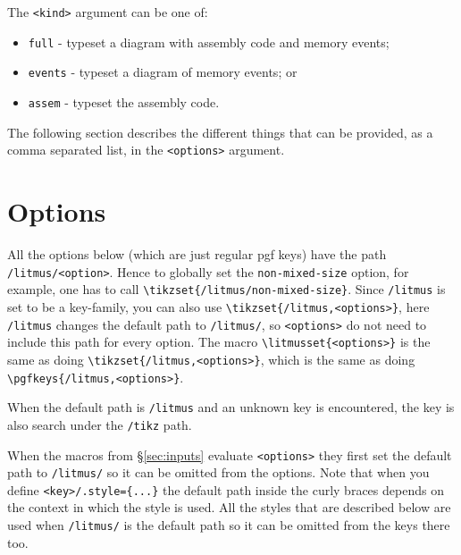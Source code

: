 \documentclass[a4paper]{article}
\begin{document}
The \lstinline|<kind>| argument can be one of:
\begin{itemize}\itemsep0ex
  \item[] \lstinline|full| - typeset a diagram with assembly code and memory events;
  \item[] \lstinline|events| - typeset a diagram of memory events; or
  \item[] \lstinline|assem| - typeset the assembly code.
\end{itemize}

The following section describes the different things that can be provided, as
a comma separated list, in the \lstinline|<options>| argument.

\section{Options}

All the options below (which are just regular pgf keys) have the path
\lstinline|/litmus/<option>|.
Hence to globally set the \lstinline|non-mixed-size| option, for example,
one has to call \lstinline+\tikzset{/litmus/non-mixed-size}+.
Since \lstinline|/litmus| is set to be a key-family, you can also use
\lstinline+\tikzset{/litmus,<options>}+, here \lstinline|/litmus| changes the
default path to \lstinline|/litmus/|, so \lstinline|<options>| do not need to include
this path for every option.
The macro \lstinline+\litmusset{<options>}+ is the same as doing
\lstinline+\tikzset{/litmus,<options>}+, which is the same as doing
\lstinline+\pgfkeys{/litmus,<options>}+.

When the default path is \lstinline|/litmus| and an unknown key is
encountered, the key is also search under the \lstinline|/tikz| path.

When the macros from \S\ref{sec:inputs} evaluate \lstinline|<options>| they
first set the default path to \lstinline|/litmus/| so it can be omitted
from the options.
Note that when you define \lstinline|<key>/.style={...}| the default path
inside the curly braces depends on the context in which the style is
used.
All the styles that are described below are used when \lstinline|/litmus/|
is the default path so it can be omitted from the keys there too.
\end{document}
